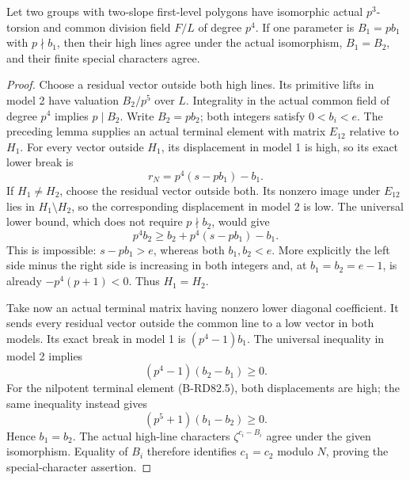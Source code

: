 \begin{proposition}
\label{prop:B-RD82-recovery}
Let two groups with two-slope first-level polygons have
isomorphic actual \(p^3\)-torsion and common division
field \(F/L\) of degree \(p^4\). If one parameter is
\(B_1=pb_1\) with \(p\nmid b_1\), then their high lines
agree under the actual isomorphism, \(B_1=B_2\), and
their finite special characters agree.
\end{proposition}
\begin{proof}
Choose a residual vector outside both high lines. Its
primitive lifts in model 2 have valuation \(B_2/p^5\)
over \(L\). Integrality in the actual common field of
degree \(p^4\) implies \(p\mid B_2\). Write
\(B_2=pb_2\); both integers satisfy \(0<b_i<e\).
The preceding lemma supplies an actual terminal element
with matrix \(E_{12}\) relative to \(H_1\). For every
vector outside \(H_1\), its displacement in model 1 is
high, so its exact lower break is
\[
                  r_N=p^4(s-pb_1)-b_1.               \tag{B-RD82.5}
\]
If \(H_1\ne H_2\), choose the residual vector outside
both. Its nonzero image under \(E_{12}\) lies in
\(H_1\setminus H_2\), so the corresponding displacement
in model 2 is low. The universal lower bound, which
does not require \(p\nmid b_2\), would give
\[
       p^4b_2\ge b_2+p^4(s-pb_1)-b_1.                \tag{B-RD82.6}
\]
This is impossible: \(s-pb_1>e\), whereas both
\(b_1,b_2<e\). More explicitly the left side minus
the right side is increasing in both integers and,
at \(b_1=b_2=e-1\), is already \(-p^4(p+1)<0\).
Thus \(H_1=H_2\).

Take now an actual terminal matrix having nonzero lower
diagonal coefficient. It sends every residual vector
outside the common line to a low vector in both models.
Its exact break in model 1 is \((p^4-1)b_1\).
The universal inequality in model 2 implies
\[
        (p^4-1)(b_2-b_1)\ge0.                        \tag{B-RD82.7}
\]
For the nilpotent terminal element (B-RD82.5), both
displacements are high; the same inequality instead gives
\[
                    (p^5+1)(b_1-b_2)\ge0.            \tag{B-RD82.8}
\]
Hence \(b_1=b_2\). The actual high-line characters
\(\zeta^{c_i-B_i}\) agree under the given isomorphism.
Equality of \(B_i\) therefore identifies \(c_1=c_2\)
modulo \(N\), proving the special-character assertion.
\end{proof}

